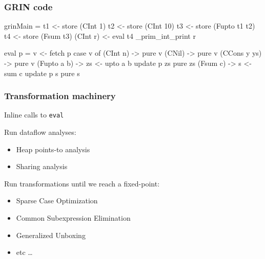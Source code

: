 \documentclass[bigger]{beamer}
\begin{document}
\begin{frame}[fragile]
\frametitle{GRIN code}

\begin{minipage}{0.4\textwidth}
	
	\begin{haskellcode}
		grinMain = 
		  t1 <- store (CInt 1)
		  t2 <- store (CInt 10)
		  t3 <- store (Fupto t1 t2)
		  t4 <- store (Fsum t3)
		  (CInt r) <- eval t4
		  _prim_int_print r
	\end{haskellcode}
\end{minipage}
\hfill
\begin{minipage}{0.48\textwidth}
	\vspace{1cm}
	\begin{haskellcode}
		eval p = 
		  v <- fetch p
		  case v of
		    (CInt n)     -> pure v
		    (CNil)       -> pure v
		    (CCons y ys) -> pure v
		    (Fupto a b) -> 
		      zs <- upto a b
		      update p zs
		      pure zs
		    (Fsum c) -> 
		      s <- sum c
		      update p s
		      pure s
	\end{haskellcode}
\end{minipage}


\end{frame}


\begin{frame}[fragile]
\frametitle{Transformation machinery}

	\begin{vfitemize}
		
		\item Inline calls to \texttt{eval}
		\item Run dataflow analyses:
			\begin{itemize}
				\item Heap points-to analysis
				\item Sharing analysis
			\end{itemize}
		\item Run transformations until we reach a fixed-point:
			\begin{itemize}
				\item Sparse Case Optimization
				\item Common Subexpression Elimination
				\item Generalized Unboxing
				\item etc \dots
			\end{itemize}
		
	\end{vfitemize}


\end{frame}
\end{document}
